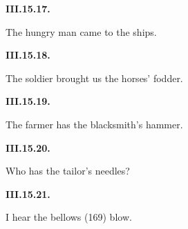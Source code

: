 \par\begin{minipage}{\linewidth}\raggedright
\textbf{III.15.17.}

The hungry man came to the ships.

\end{minipage}\par\addvspace{4pt}

\par\begin{minipage}{\linewidth}\raggedright
\textbf{III.15.18.}

The soldier brought us the horses’ fodder.

\end{minipage}\par\addvspace{4pt}

\par\begin{minipage}{\linewidth}\raggedright
\textbf{III.15.19.}

The farmer has the blacksmith’s hammer.

\end{minipage}\par\addvspace{4pt}

\par\begin{minipage}{\linewidth}\raggedright
\textbf{III.15.20.}

Who has the tailor’s needles?

\end{minipage}\par\addvspace{4pt}

\par\begin{minipage}{\linewidth}\raggedright
\textbf{III.15.21.}

I hear the bellows (169) blow.

\end{minipage}\par\addvspace{4pt}

